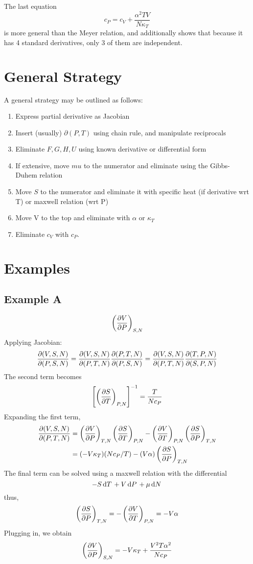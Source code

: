 The last equation
\begin{equation}
	c_P=c_V+\frac{\alpha^2TV}{N\kappa_T}
\end{equation}
is more general than the Meyer relation, and additionally shows that because it has 4 standard derivatives, only 3 of them are independent.

\section{General Strategy}
A general strategy may be outlined as follows:
\begin{enumerate}
	\item Express partial derivative as Jacobian
	\item Insert (usually) \(\partial(P,T)\) using chain rule, and manipulate reciprocals
	\item Eliminate \(F,G,H,U\) using known derivative or differential form
	\item If extensive, move \(mu\) to the numerator and eliminate using the Gibbs-Duhem relation
	\item Move \(S\) to the numerator and eliminate it with specific heat (if derivative wrt T) or maxwell relation (wrt P)
	\item Move V to the top and eliminate with \(\alpha\) or \(\kappa_T\)
	\item Eliminate \(c_V\) with \(c_P\).
\end{enumerate}

\section{Examples}
\subsection{Example A}
\[\left(\frac{\partial V}{\partial P}\right)_{S,N}\]
Applying Jacobian:
\[\frac{\partial (V,S,N)}{\partial (P,S,N)} = \frac{\partial (V,S,N)}{\partial (P,T,N)}\frac{\partial (P,T,N)}{\partial (P,S,N)} = \frac{\partial (V,S,N)}{\partial (P,T,N)}\frac{\partial (T,P,N)}{\partial (S,P,N)}\]
The second term becomes
\[\left[\left(\frac{\partial S}{\partial T}\right)_{P,N}\right]^{-1}=\frac{T}{Nc_P}\]
Expanding the first term,
\begin{align*}\frac{\partial (V,S,N)}{\partial (P,T,N)}&=\left(\frac{\partial V}{\partial P}\right)_{T,N}\left(\frac{\partial S}{\partial T}\right)_{P,N}-\left(\frac{\partial V}{\partial T}\right)_{P,N}\left(\frac{\partial S}{\partial P}\right)_{T,N}\\
	&=(-V\kappa_T)(Nc_P/T)-(V\alpha)\left(\frac{\partial S}{\partial P}\right)_{T,N}
\end{align*}
The final term can be solved using a maxwell relation with the differential 
\[-S\d{T}+V\d{P}+\mu\d{N}\]
thus,
\[\left(\frac{\partial S}{\partial P}\right)_{T,N} = -\left(\frac{\partial V}{\partial T}\right)_{P,N}=-V\alpha\]
Plugging in, we obtain
\[\left(\frac{\partial V}{\partial P}\right)_{S,N}=-V\kappa_T+\frac{V^2T\alpha^2}{Nc_P}\]

